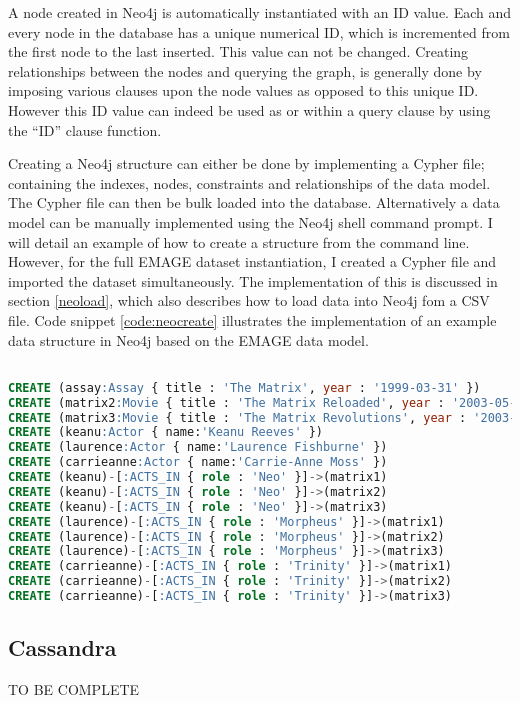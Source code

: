 A node created in Neo4j is automatically instantiated with an ID value. Each and every node in the database has a unique numerical ID, which is incremented from the first node to the last inserted. This value can not be changed. Creating relationships between the nodes and querying the graph, is generally done by imposing various clauses upon the node values as opposed to this unique ID. However this ID value can indeed be used as or within a query clause by using the ``ID'' clause function.

Creating a Neo4j structure can either be done by implementing a Cypher file; containing the indexes, nodes, constraints and relationships of the data model. The Cypher file can then be bulk loaded into the database. Alternatively a data model can be manually implemented using the Neo4j shell command prompt. I will detail an example of how to create a structure from the command line. However, for the full EMAGE dataset instantiation, I created a Cypher file and imported the dataset simultaneously. The implementation of this is discussed in section \ref{neoload}, which also describes how to load data into Neo4j fom a CSV file. Code snippet \ref{code:neocreate} illustrates the implementation of an example data structure in Neo4j based on the EMAGE data model.

\newpage
\vspace*{\fill}
\begin{lstlisting}[language=SQL, caption=Creation of example data structure in Neo4j., label=code:neocreate]

CREATE (assay:Assay { title : 'The Matrix', year : '1999-03-31' })
CREATE (matrix2:Movie { title : 'The Matrix Reloaded', year : '2003-05-07' })
CREATE (matrix3:Movie { title : 'The Matrix Revolutions', year : '2003-10-27' })
CREATE (keanu:Actor { name:'Keanu Reeves' })
CREATE (laurence:Actor { name:'Laurence Fishburne' })
CREATE (carrieanne:Actor { name:'Carrie-Anne Moss' })
CREATE (keanu)-[:ACTS_IN { role : 'Neo' }]->(matrix1)
CREATE (keanu)-[:ACTS_IN { role : 'Neo' }]->(matrix2)
CREATE (keanu)-[:ACTS_IN { role : 'Neo' }]->(matrix3)
CREATE (laurence)-[:ACTS_IN { role : 'Morpheus' }]->(matrix1)
CREATE (laurence)-[:ACTS_IN { role : 'Morpheus' }]->(matrix2)
CREATE (laurence)-[:ACTS_IN { role : 'Morpheus' }]->(matrix3)
CREATE (carrieanne)-[:ACTS_IN { role : 'Trinity' }]->(matrix1)
CREATE (carrieanne)-[:ACTS_IN { role : 'Trinity' }]->(matrix2)
CREATE (carrieanne)-[:ACTS_IN { role : 'Trinity' }]->(matrix3)

\end{lstlisting}
\vspace*{\fill}
\newpage



\subsection*{Cassandra}
TO BE COMPLETE












